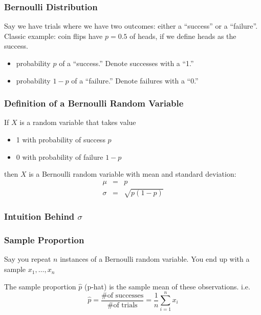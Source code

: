 \documentclass[handout]{beamer}
\newcommand{\blue}[1]{\textcolor{blue2}{#1}}
\begin{document}
\begin{frame}
\frametitle{Bernoulli Distribution}

Say we have trials where we have two outcomes:  either a ``success'' or a ``failure''.  Classic example:  coin flips have $p=0.5$ of heads, if we define heads as the success.

\vspace{0.5cm}

\begin{itemize}
\item probability $p$ of a ``success.''  Denote successes with a ``1.''
\item probability $1-p$ of a ``failure.''  Denote failures with a ``0.''
\end{itemize}


\end{frame}


\begin{frame}[fragile]
\frametitle{Definition of a Bernoulli Random Variable}

If $X$ is a random variable that takes value
\begin{itemize}
\item 1 with probability of success $p$
\item 0 with probability of failure $1-p$
\end{itemize}

then $X$ is a \blue{Bernoulli random variable} with mean and standard deviation:
\begin{eqnarray*}
\mu &=& p\\
\sigma &=& \sqrt{p(1-p)}
\end{eqnarray*}

\end{frame}


\begin{frame}[fragile]
\frametitle{Intuition Behind $\sigma$}


\end{frame}


\begin{frame}[fragile]
\frametitle{Sample Proportion}
Say you repeat $n$ instances of a Bernoulli random variable.  You end up with a sample $x_1, \ldots, x_{n}$

\vspace{0.5cm}

The \blue{sample proportion $\widehat{p}$} (p-hat) is the sample mean of these observations.  i.e. \[
\widehat{p} = \frac{\mbox{\# of successes}}{\mbox{\# of trials}} = \frac{1}{n}\sum_{i=1}^{n}x_i
\]

\end{frame}
\end{document}
